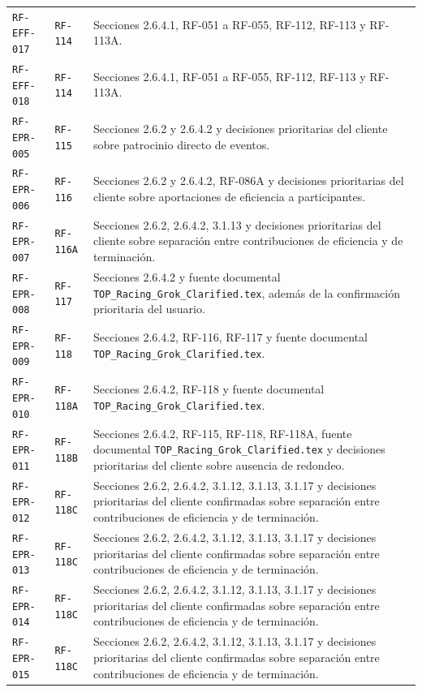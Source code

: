\documentclass[10pt,letterpaper]{article}
\begin{document}
\begin{landscape}
\begin{longtable}{P{2.7cm}P{2.6cm}P{15.7cm}}
\texttt{RF-EFF-017} & \texttt{RF-114} & Secciones 2.6.4.1, RF-051 a RF-055, RF-112, RF-113 y RF-113A.\\
\texttt{RF-EFF-018} & \texttt{RF-114} & Secciones 2.6.4.1, RF-051 a RF-055, RF-112, RF-113 y RF-113A.\\
\texttt{RF-EPR-005} & \texttt{RF-115} & Secciones 2.6.2 y 2.6.4.2 y decisiones prioritarias del cliente sobre patrocinio directo de eventos.\\
\texttt{RF-EPR-006} & \texttt{RF-116} & Secciones 2.6.2 y 2.6.4.2, RF-086A y decisiones prioritarias del cliente sobre aportaciones de eficiencia a participantes.\\
\texttt{RF-EPR-007} & \texttt{RF-116A} & Secciones 2.6.2, 2.6.4.2, 3.1.13 y decisiones prioritarias del cliente sobre separación entre contribuciones de eficiencia y de terminación.\\
\texttt{RF-EPR-008} & \texttt{RF-117} & Secciones 2.6.4.2 y fuente documental \texttt{TOP\_Racing\_Grok\_Clarified.tex}, además de la confirmación prioritaria del usuario.\\
\texttt{RF-EPR-009} & \texttt{RF-118} & Secciones 2.6.4.2, RF-116, RF-117 y fuente documental \texttt{TOP\_Racing\_Grok\_Clarified.tex}.\\
\texttt{RF-EPR-010} & \texttt{RF-118A} & Secciones 2.6.4.2, RF-118 y fuente documental \texttt{TOP\_Racing\_Grok\_Clarified.tex}.\\
\texttt{RF-EPR-011} & \texttt{RF-118B} & Secciones 2.6.4.2, RF-115, RF-118, RF-118A, fuente documental \texttt{TOP\_Racing\_Grok\_Clarified.tex} y decisiones prioritarias del cliente sobre ausencia de redondeo.\\
\texttt{RF-EPR-012} & \texttt{RF-118C} & Secciones 2.6.2, 2.6.4.2, 3.1.12, 3.1.13, 3.1.17 y decisiones prioritarias del cliente confirmadas sobre separación entre contribuciones de eficiencia y de terminación.\\
\texttt{RF-EPR-013} & \texttt{RF-118C} & Secciones 2.6.2, 2.6.4.2, 3.1.12, 3.1.13, 3.1.17 y decisiones prioritarias del cliente confirmadas sobre separación entre contribuciones de eficiencia y de terminación.\\
\texttt{RF-EPR-014} & \texttt{RF-118C} & Secciones 2.6.2, 2.6.4.2, 3.1.12, 3.1.13, 3.1.17 y decisiones prioritarias del cliente confirmadas sobre separación entre contribuciones de eficiencia y de terminación.\\
\texttt{RF-EPR-015} & \texttt{RF-118C} & Secciones 2.6.2, 2.6.4.2, 3.1.12, 3.1.13, 3.1.17 y decisiones prioritarias del cliente confirmadas sobre separación entre contribuciones de eficiencia y de terminación.\\

\end{longtable}
\end{landscape}
\end{document}
